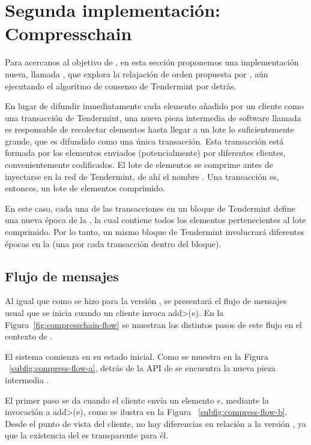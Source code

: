 

\section{Segunda implementación: Compresschain}\label{sec:compresschain}

Para acercanos al objetivo de \setchain, en esta sección proponemos
%
una implementación nueva, llamada \compresschain, que explora
la relajación de orden propuesta por \setchain, aún ejecutando el algoritmo de
consenso de Tendermint por detrás.
%

En lugar de difundir inmediatamente cada elemento añadido por un cliente como una
transacción de Tendermint, una nueva pieza intermedia de software llamada \collector
es responsable de recolectar elementos hasta llegar a un lote lo suficientemente grande,
que es difundido como una única transacción.
%
Esta transacción está formada por los elementos
enviados (potencialmente) por diferentes clientes, convenientemente codificados.
%
El lote de elementos se comprime antes de inyectarse en la red de Tendermint, de ahí el nombre
\compresschain.
%
Una transacción es, entonces, un lote de elementos comprimido.

En este caso, cada una de las transacciones en un bloque de Tendermint define una
nueva época de la \setchain, la cual contiene todos los elementos pertenecientes al lote
comprimido.
Por lo tanto, un mismo bloque de Tendermint involucrará diferentes épocas en la \setchain
(una por cada transacción dentro del bloque).

\subsection{Flujo de mensajes}
Al igual que como se hizo para la versión \vanilla, se presentará el flujo de mensajes usual
que se inicia cuando un cliente invoca \<add>(e).
En la Figura~\ref{fig:compresschain-flow} se muestran los distintos pasos de
este flujo en el contexto de \compresschain.
%

El sistema comienza en su estado inicial.
Como se muestra en la Figura ~\ref{subfig:compress-flow-a}, detrás de la API de \setchain
se encuentra la nueva pieza intermedia \collector.

%

El primer paso se da cuando el cliente envía un elemento $e$, mediante la invocación a \<add>(e), como se
ilustra en la Figura ~\ref{subfig:compress-flow-b}.
Desde el punto de vista del cliente, no hay diferencias en relación a la versión \vanilla, ya que
la existencia del \collector es transparente para él.

